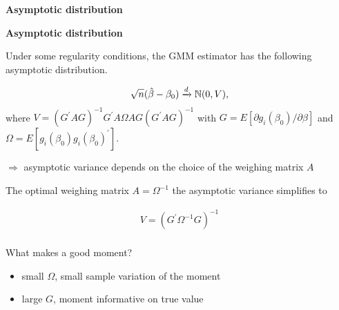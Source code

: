 \begin{frame}\begin{center}
		\LARGE\textbf{Asymptotic distribution}
\end{center}\end{frame}
\begin{frame}\textbf{Asymptotic distribution}\vspace{0.3cm}

Under some regularity conditions, the GMM estimator has the following asymptotic distribution.

\begin{align*}
\sqrt{n}(\hat{\beta} - \beta_0) \xrightarrow{d} \mathbb{N} (0, V),
\end{align*}
where $V = (G^\prime A G)^{-1} G^\prime A \Omega A G (G^\prime A G)^{-1}$ with $G = E[\partial g_i(\beta_0) / \partial \beta]$ and $\Omega = E[g_i(\beta_0)g_i(\beta_0)^\prime]$.\\\vspace{0.3cm}

$\Rightarrow$ asymptotic variance depends on the choice of the weighing matrix $A$

\end{frame}
\begin{frame}

The optimal weighing matrix $A = \Omega^{-1}$ the asymptotic variance simplifies to

\begin{align*}
V = (G^\prime  \Omega^{-1} G)^{-1}\\
\end{align*}

What makes a good moment?\vspace{0.3cm}
\begin{itemize}\setlength\itemsep{1em}
\item small $\Omega$, small sample variation of the moment
\item large $G$, moment informative on true value
\end{itemize}


\end{frame}
